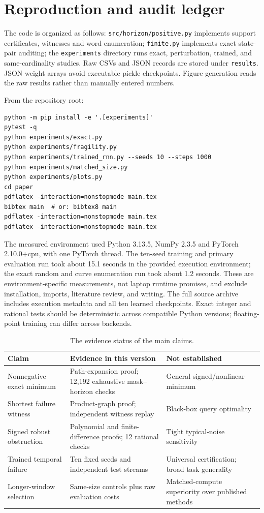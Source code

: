 \appendix
\section{Reproduction and audit ledger}
The code is organized as follows: \texttt{src/horizon/positive.py} implements support certificates, witnesses and word enumeration; \texttt{finite.py} implements exact state-pair auditing; the \texttt{experiments} directory runs exact, perturbation, trained, and same-cardinality studies. Raw CSVs and JSON records are stored under \texttt{results}. JSON weight arrays avoid executable pickle checkpoints. Figure generation reads the raw results rather than manually entered numbers.

From the repository root:
\begin{verbatim}
python -m pip install -e '.[experiments]'
pytest -q
python experiments/exact.py
python experiments/fragility.py
python experiments/trained_rnn.py --seeds 10 --steps 1000
python experiments/matched_size.py
python experiments/plots.py
cd paper
pdflatex -interaction=nonstopmode main.tex
bibtex main  # or: bibtex8 main
pdflatex -interaction=nonstopmode main.tex
pdflatex -interaction=nonstopmode main.tex
\end{verbatim}
The measured environment used Python 3.13.5, NumPy 2.3.5 and PyTorch 2.10.0+cpu, with one PyTorch thread. The ten-seed training and primary evaluation run took about 15.1 seconds in the provided execution environment; the exact random and curve enumeration run took about 1.2 seconds. These are environment-specific measurements, not laptop runtime promises, and exclude installation, imports, literature review, and writing. The full source archive includes execution metadata and all ten learned checkpoints. Exact integer and rational tests should be deterministic across compatible Python versions; floating-point training can differ across backends.

\begin{table}[h]
\centering\small
\begin{tabular}{p{.24\linewidth}p{.33\linewidth}p{.32\linewidth}}
\toprule
Claim & Evidence in this version & Not established \\
\midrule
Nonnegative exact minimum & Path-expansion proof; 12,192 exhaustive mask--horizon checks & General signed/nonlinear minimum \\
Shortest failure witness & Product-graph proof; independent witness replay & Black-box query optimality \\
Signed robust obstruction & Polynomial and finite-difference proofs; 12 rational checks & Tight typical-noise sensitivity \\
Trained temporal failure & Ten fixed seeds and independent test streams & Universal certification; broad task generality \\
Longer-window selection & Same-size controls plus raw evaluation costs & Matched-compute superiority over published methods \\
\bottomrule
\end{tabular}
\caption{The evidence status of the main claims.}
\end{table}


